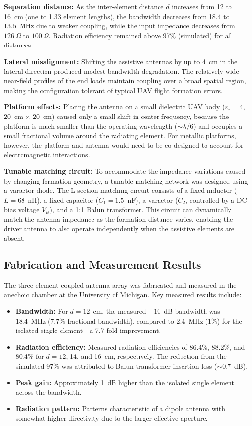 \textbf{Separation distance:}  As the inter-element distance $d$ increases from 12 to 16~cm (one to 1.33 element lengths), the bandwidth decreases from 18.4 to 13.5~MHz due to weaker coupling, while the input impedance decreases from $126~\Omega$ to $100~\Omega$.  Radiation efficiency remained above 97\% (simulated) for all distances.

\textbf{Lateral misalignment:}  Shifting the assistive antennas by up to 4~cm in the lateral direction produced modest bandwidth degradation.  The relatively wide near-field profiles of the end loads maintain coupling over a broad spatial region, making the configuration tolerant of typical UAV flight formation errors.

\textbf{Platform effects:}  Placing the antenna on a small dielectric UAV body ($\varepsilon_r = 4$, 20~cm $\times$ 20~cm) caused only a small shift in center frequency, because the platform is much smaller than the operating wavelength ($\sim\lambda/6$) and occupies a small fractional volume around the radiating element.  For metallic platforms, however, the platform and antenna would need to be co-designed to account for electromagnetic interactions.

\textbf{Tunable matching circuit:}  To accommodate the impedance variations caused by changing formation geometry, a tunable matching network was designed using a varactor diode.  The L-section matching circuit consists of a fixed inductor ($L = 68$~nH), a fixed capacitor ($C_1 = 1.5$~nF), a varactor ($C_2$, controlled by a DC bias voltage $V_B$), and a 1:1 Balun transformer.  This circuit can dynamically match the antenna impedance as the formation distance varies, enabling the driver antenna to also operate independently when the assistive elements are absent.

\subsection{Fabrication and Measurement Results}

The three-element coupled antenna array was fabricated and measured in the anechoic chamber at the University of Michigan.  Key measured results include:

\begin{itemize}
\item \textbf{Bandwidth:}  For $d = 12$~cm, the measured $-10$~dB bandwidth was 18.4~MHz (7.7\% fractional bandwidth), compared to 2.4~MHz (1\%) for the isolated single element---a 7.7-fold improvement.
\item \textbf{Radiation efficiency:}  Measured radiation efficiencies of 86.4\%, 88.2\%, and 80.4\% for $d = 12$, 14, and 16~cm, respectively.  The reduction from the simulated 97\% was attributed to Balun transformer insertion loss ($\sim\!0.7$~dB).
\item \textbf{Peak gain:}  Approximately 1~dB higher than the isolated single element across the bandwidth.
\item \textbf{Radiation pattern:}  Patterns characteristic of a dipole antenna with somewhat higher directivity due to the larger effective aperture.
\end{itemize}

